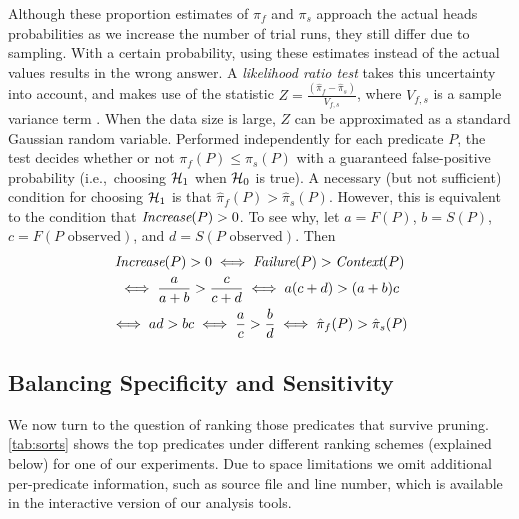 Although these proportion estimates of $\pi_f$ and $\pi_s$ approach the
actual heads probabilities as we increase the number of trial runs, they
still differ due to sampling.  With a certain probability, using these
estimates instead of the actual values results in the wrong
answer.  A \textit{likelihood ratio test} takes this uncertainty into
account, and makes use of the statistic $ Z = \frac{(\hat \pi_f - \hat
  \pi_s)}{V_{f,s}}$, where $V_{f,s}$ is a sample variance term
\cite{Lehmann:1986:hyptest}.  When
the data size is large, $Z$ can be approximated as a standard Gaussian
random variable.  Performed independently for each predicate $P$, the
test decides whether or not $\pi_f(P) \leq \pi_s(P)$ with a guaranteed
false-positive probability (i.e.,\ choosing ${\mathcal{H}}_1$ when ${\mathcal{H}}_0$ is true).
A necessary (but not sufficient) condition for choosing ${\mathcal{H}}_1$ is that
$\hat \pi_f(P) > \hat \pi_s(P)$.  However, this is
equivalent to the condition that $\textit{Increase}(P) > 0$.  To see why,
let $a = F(P)$, $b = S(P)$, $c = F(\text{$P$ observed})$, and $d =
S(\text{$P$ observed})$.
Then
\begin{gather*}
  \textit{Increase}(P) > 0 \iff \textit{Failure}(P) > \textit{Context}(P) \\
  \iff \frac{a}{a+b} > \frac{c}{c+d}
  \iff a (c+d) > (a+b) c \\
  \iff ad > bc \iff \frac{a}{c} > \frac{b}{d}
  \iff \hat \pi_f(P) > \hat \pi_s(P)
\end{gather*}

\subsection{Balancing Specificity and Sensitivity}
\label{sec:ranking}



\newlength{\textsegwidth}
\setlength{\textsegwidth}{2ex}
\newcommand{\textseg}[1]{\parbox{\textsegwidth}{\segment{#1}{\textsegwidth}}}

We now turn to the question of ranking those predicates that survive
pruning.  \autoref{tab:sorts} shows the top predicates under different
ranking schemes (explained below) for one of our experiments.  Due to
space limitations we omit additional per-predicate information, such
as source file and line number, which is available in the interactive
version of our analysis tools.

